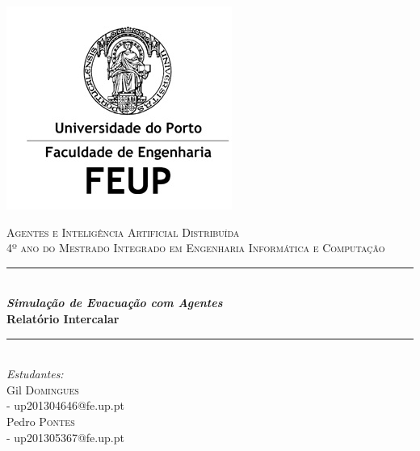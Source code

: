 \documentclass[12pt]{article}
\begin{document}
\begin{titlepage}

\newcommand{\HRule}{\rule{\linewidth}{1mm}} %

\center %
 

\includegraphics{feup.jpg}

\textsc{\large Agentes e Inteligência Artificial Distribuída}\\[0.8cm] %
\textsc{\large 4º ano do Mestrado Integrado em Engenharia Informática e Computação}\\[0.8cm] %


\HRule \\[1.2cm]
{ \huge \bfseries \textit{Simulação de Evacuação com Agentes}}\\[0.6cm] %
{ \large \bfseries Relatório Intercalar} \\[0.6cm]
\HRule \\[2cm]
 


\Large \emph{Estudantes:}\\[0.5cm] \normalsize
Gil \textsc{Domingues}\\[0.1cm]  
- up201304646@fe.up.pt\\[0.1cm]
Pedro \textsc{Pontes}\\[0.1cm]
- up201305367@fe.up.pt\\[2cm] 


\end{titlepage}
\end{document}
